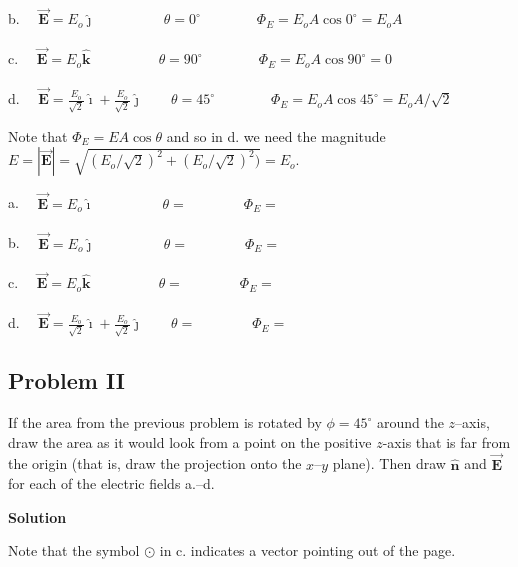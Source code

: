 \documentclass{article}
\newcommand{\ds}[0]{\displaystyle}
\newcommand{\ihat}[0]{\hat{\boldsymbol{\imath}}}
\newcommand{\jhat}[0]{\hat{\boldsymbol{\jmath}}}
\newcommand{\khat}[0]{\hat{\boldsymbol{k}}}
\newcommand{\bfvec}[1]{\vec{\mathbf{#1}}}
\begin{document}
\begin{enumerate}
        b. $\quad\ds\bfvec{E}=E_o\jhat\qquad\phantom{+ \frac{E_o}{\sqrt{2}}\jhat}\theta=0^\circ\qquad\qquad\Phi_E=E_oA\cos 0^\circ=E_oA$ 

        c. $\quad\ds\bfvec{E}=E_o\khat\qquad\phantom{+\frac{E_o}{\sqrt{2}}\jhat}\theta=90^\circ\qquad\qquad\Phi_E=E_oA\cos 90^\circ=0$ 

        d. $\quad\ds\bfvec{E}=\frac{E_o}{\sqrt{2}}\ihat + \frac{E_o}{\sqrt{2}}\jhat\qquad\theta=45^\circ\qquad\qquad\Phi_E=E_o A\cos 45^\circ=E_oA/\sqrt{2}$

        Note that $\Phi_E=EA\cos\theta$ and so in d. we need the magnitude $E = |\bfvec{E}| = \sqrt{(E_o/\sqrt{2})^2+(E_o/\sqrt{2})^2)}=E_o$.
        \else

        

        a. $\quad\ds\bfvec{E}=E_o\ihat\qquad\phantom{+\frac{E_o}{\sqrt{2}}\jhat}\theta=\qquad\qquad\Phi_E=$

        b. $\quad\ds\bfvec{E}=E_o\jhat\qquad\phantom{+ \frac{E_o}{\sqrt{2}}\jhat}\theta=\qquad\qquad\Phi_E=$ 

        c. $\quad\ds\bfvec{E}=E_o\khat\qquad\phantom{+\frac{E_o}{\sqrt{2}}\jhat}\theta=\qquad\qquad\Phi_E=$ 

        d. $\quad\ds\bfvec{E}=\frac{E_o}{\sqrt{2}}\ihat + \frac{E_o}{\sqrt{2}}\jhat\qquad\theta=\qquad\qquad\Phi_E=$

        \newpage
        \fi

\end{enumerate}

\subsection{Problem II}

\ifsolutions

\else


\fi

If the area from the previous problem is rotated by $\phi=45^\circ$ around the $z$--axis, draw the area as it would look from a point on the positive $z$-axis that is far from the origin (that is, draw the projection onto the $x$--$y$ plane). Then draw $\hat{\mathbf{n}}$ and $\bfvec{E}$ for each of the electric fields a.--d.

\ifsolutions
\textbf{Solution} 

Note that the symbol $\odot$ in c. indicates a vector pointing out of the page.
\end{document}
